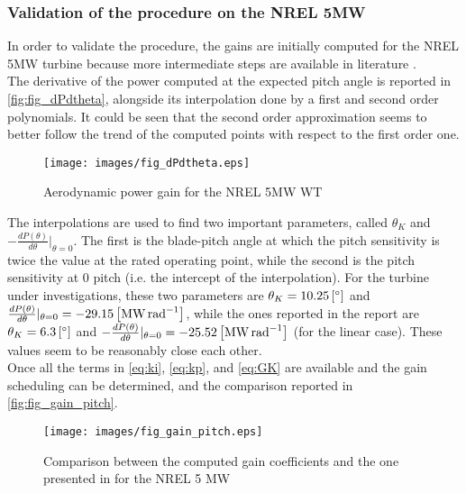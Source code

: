 \subsubsection{Validation of the procedure on the NREL 5MW}\label{subsec:gain_schdeuling_NREL5MW}
In order to validate the procedure, the gains are initially computed for the NREL 5MW turbine because more intermediate steps are available in literature \cite{NREL_5MW_reference}.\\
The derivative of the power computed at the expected pitch angle is  reported in \autoref{fig:fig_dPdtheta}, alongside its interpolation done by a first and second order polynomials. It could be seen that the second order approximation seems to better follow the trend of the computed points with respect to the first order one. 
\begin{figure}[htb]
    \centering
    \texttt{[image: images/fig\_dPdtheta.eps]}
    \caption{Aerodynamic power gain for the NREL 5MW WT}
    \label{fig:fig_dPdtheta}
\end{figure}

The interpolations are used to find two important parameters, called $\theta_{K}$ and  $-\frac{dP(\theta)}{d\theta}\vert_{\theta=0}$. The first is the blade-pitch angle at which the pitch sensitivity is twice the value at the rated operating point, while the second is the pitch sensitivity at 0 pitch (i.e. the intercept of the interpolation). For the turbine under investigations, these two parameters are $\theta_K=10.25 \left[\si{\degree}\right]$ and  $\frac{dP(\theta)}{d\theta}\vert_{\theta=0} = -29.15 \left[\si{\mega\watt\per\radian}\right]$, while the ones reported in the report are $\theta_K=6.3 \left[\si{\degree}\right]$ and  $-\frac{dP(\theta)}{d\theta}\vert_{\theta=0} = -25.52\left[\si{\mega\watt\per\radian}\right]$ (for the linear case). These values seem to be reasonably close each other.\\ 
Once all the terms in \autoref{eq:ki}, \ref{eq:kp}, and \ref{eq:GK} are available and the gain scheduling can be determined, and the comparison reported in \autoref{fig:fig_gain_pitch}.
\begin{figure}[htb]
    \centering
    \texttt{[image: images/fig\_gain\_pitch.eps]}
    \caption{Comparison between the computed gain coefficients and the one presented in \cite{NREL_5MW_reference} for the NREL 5 MW}
    \label{fig:fig_gain_pitch}
\end{figure}


